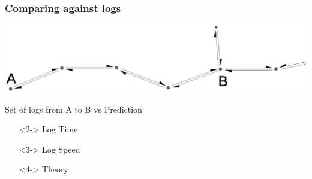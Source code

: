 \documentclass{beamer}
\begin{document}
	\begin{frame}
		\frametitle{Comparing against logs}
		\includegraphics[width=\textwidth]{simpleDCEL.eps}
		\\\vspace{0.5cm}
		\begin{center}
			Set of logs from A to B vs Prediction
			\begin{itemize}
				\centering
				\item[]<2-> Log Time
				\item[]<3-> Log Speed
				\item[]<4-> Theory
			\end{itemize}
		\end{center}
	\end{frame}
\end{document}
